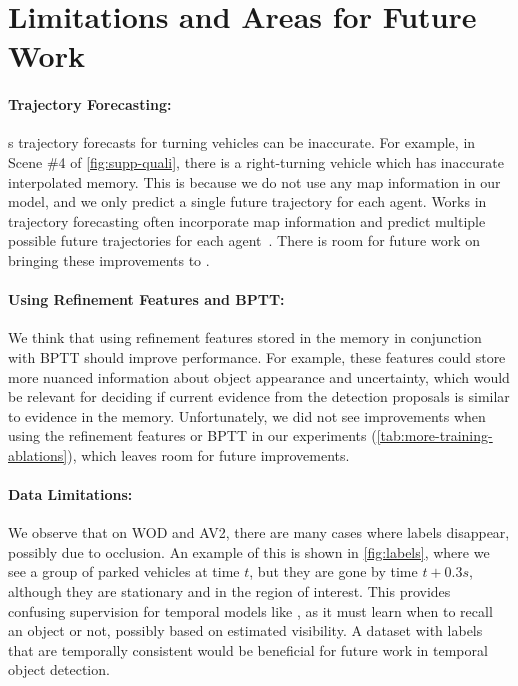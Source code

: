 \section{Limitations and Areas for Future Work}

\paragraph{Trajectory Forecasting:}

\ourmodel{}s trajectory forecasts for turning vehicles can be inaccurate.
For example, in Scene \#4 of \cref{fig:supp-quali}, there is a right-turning vehicle which has inaccurate interpolated memory.
This is because we do not use any map information in our model, and we only predict a single future trajectory for each agent.
Works in trajectory forecasting often incorporate map information and predict multiple possible future trajectories for each agent~\cite{cui2023gorela,casas2024detra}.
There is room for future work on bringing these improvements to \ourmodel{}.

\paragraph{Using Refinement Features and BPTT:}

We think that using refinement features stored in the memory in conjunction with BPTT should improve performance.
For example, these features could store more nuanced information about object appearance and uncertainty, which
would be relevant for deciding if current evidence from the detection proposals is similar to evidence in the memory.
Unfortunately, we did not see improvements when using the refinement features or BPTT in our experiments (\cref{tab:more-training-ablations}),
which leaves room for future improvements.

\paragraph{Data Limitations:}

We observe that on WOD and AV2, there are many cases where labels disappear, possibly due to occlusion.
An example of this is shown in \cref{fig:labels}, where we see a group of parked vehicles at time $t$,
but they are gone by time $t + 0.3s$, although they are stationary and in the region of interest.
This provides confusing supervision for temporal models like \ourmodel{}, as it must learn when to recall an object or not,
possibly based on estimated visibility.
A dataset with labels that are temporally consistent would be beneficial for future work in temporal object detection.

